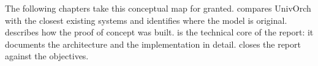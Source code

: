 The following chapters take this conceptual map for granted.
 compares UnivOrch with the closest existing
systems and identifies where the model is original.
 describes how the proof of concept was built.
 is the technical core of the report: it
documents the architecture and the implementation in detail.
 closes the report against the objectives.
